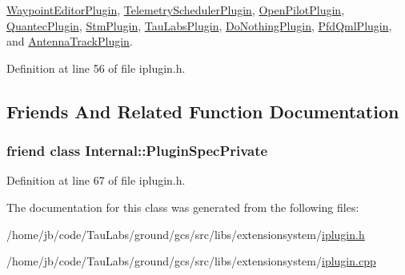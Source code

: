 \hyperlink{group___waypoint_editor_gadget_plugin_ga4fdf75a1aea39e6e89f5fe83b8b812f9}{\-Waypoint\-Editor\-Plugin}, \hyperlink{group___telemetry_scheduler_gadget_plugin_gaee2ae6611062688d3b9c1a883057d399}{\-Telemetry\-Scheduler\-Plugin}, \hyperlink{group___boards___open_pilot_plugin_gab41fd915d672acefc699cd2185ac1037}{\-Open\-Pilot\-Plugin}, \hyperlink{group___boards___quantec_ga775ecc021e3638b3652f5e49edd2f748}{\-Quantec\-Plugin}, \hyperlink{group___boards___stm_ga0f818aaaedbf072833aef3d3ac944593}{\-Stm\-Plugin}, \hyperlink{group___boards___tau_labs_plugin_ga7c69e7ef31a4c5b510b1aa88de11dda9}{\-Tau\-Labs\-Plugin}, \hyperlink{group___do_nothing_plugin_gaa91993d8fa19262963650daf59993688}{\-Do\-Nothing\-Plugin}, \hyperlink{class_pfd_qml_plugin_a39d4ab7d539a9a77adc57b8ecf33e781}{\-Pfd\-Qml\-Plugin}, and \hyperlink{class_antenna_track_plugin_a3628ddddb3154268c34dfd1f69c6e8f4}{\-Antenna\-Track\-Plugin}.



\-Definition at line 56 of file iplugin.\-h.



\subsection{\-Friends \-And \-Related \-Function \-Documentation}
\hypertarget{class_extension_system_1_1_i_plugin_ab527aa6637a3541a3260928aef682007}{
\subsubsection[{\-Internal\-::\-Plugin\-Spec\-Private}]{\setlength{\rightskip}{0pt plus 5cm}friend class {\bf \-Internal\-::\-Plugin\-Spec\-Private}}}\label{class_extension_system_1_1_i_plugin_ab527aa6637a3541a3260928aef682007}


\-Definition at line 67 of file iplugin.\-h.



\-The documentation for this class was generated from the following files\-:\begin{DoxyCompactItemize}
\item 
/home/jb/code/\-Tau\-Labs/ground/gcs/src/libs/extensionsystem/\hyperlink{iplugin_8h}{iplugin.\-h}\item 
/home/jb/code/\-Tau\-Labs/ground/gcs/src/libs/extensionsystem/\hyperlink{iplugin_8cpp}{iplugin.\-cpp}\end{DoxyCompactItemize}
